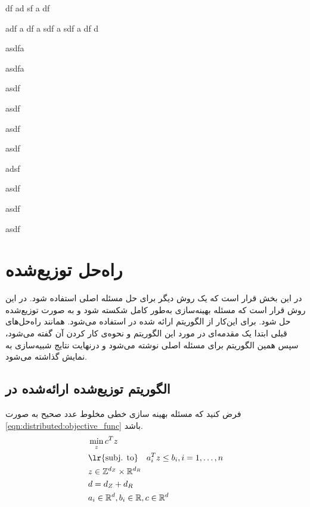 df
ad
sf
a
df



adf
a
df
a
sdf
a
sdf
a
df
d


asdfa


asdfa

asdf

asdf

asdf

asdf

adsf

asdf

asdf

asdf








\section{راه‌حل توزیع‌شده}

در این بخش قرار است که یک روش دیگر برای حل مسئله اصلی استفاده شود. در این روش قرار است که مسئله بهینه‌سازی به‌طور کامل شکسته شود و به صورت توزیع‌شده حل شود. برای این‌کار از الگوریتم ارائه شده در \cite{testa2019distributed} استفاده می‌شود. همانند راه‌حل‌های قبلی ابتدا یک مقدمه‌ای  در مورد این الگوریتم و نحوه‌ی کار کردن آن گفته می‌شود، سپس همین الگوریتم برای مسئله اصلی نوشته می‌شود و درنهایت نتایج شبیه‌سازی به نمایش گذاشته می‌شود. 
\subsection{الگوریتم توزیع‌شده ارائه‌شده در \cite{testa2019distributed}}
فرض کنید که مسئله بهینه سازی خطی مخلوط عدد صحیح به صورت \cref{eqn:distributed:objective_func} باشد. 
\begin{subequations}\label{eqn:distributed:objective_func}
	\begin{align}
		&\min_{z}c^Tz \notag \\
		&\text{\lr{subj. to}} \quad a_i^Tz \le b_i, i = 1, \dots, n \notag \\
		&z \in \mathbb{Z}^{d_Z} \times \mathbb{R}^{d_R} \\
		&d = d_Z + d_R \notag \\
		&a_i \in \mathbb{R}^d , b_i \in \mathbb{R}, c \in \mathbb{R}^d
	\end{align}
\end{subequations}










